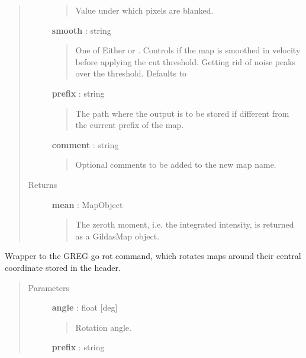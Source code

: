 \documentclass[a4paper,10pt,english]{sphinxmanual}
\begin{document}
\begin{fulllineitems}
\begin{fulllineitems}
\begin{quote}
\begin{description}
\begin{quote}
Value under which pixels are blanked.
\end{quote}

\textbf{smooth} : string
\begin{quote}

One of Either  or . Controls
if the map is smoothed in velocity before applying the cut
threshold. Getting rid of noise peaks over the threshold.
Defaults to 
\end{quote}

\textbf{prefix} : string
\begin{quote}

The path where the output is to be stored if different
from the current prefix of the map.
\end{quote}

\textbf{comment} : string
\begin{quote}

Optional comments to be added to the new map name.
\end{quote}

\item[{Returns }] \leavevmode
\textbf{mean} : MapObject
\begin{quote}

The zeroth moment, i.e. the integrated intensity, is returned as a
GildasMap object.
\end{quote}

\end{description}\end{quote}

\end{fulllineitems}


\begin{fulllineitems}
\label{maps:astrolyze.maps.gildas.GildasMap.goRot}
Wrapper to the GREG go rot command, which rotates maps around their
central coordinate stored in the header.
\begin{quote}\begin{description}
\item[{Parameters }] \leavevmode
\textbf{angle} : float {[}deg{]}
\begin{quote}

Rotation angle.
\end{quote}

\textbf{prefix} : string
\begin{quote}


\end{quote}
\end{description}
\end{quote}
\end{fulllineitems}
\end{fulllineitems}
\end{document}
